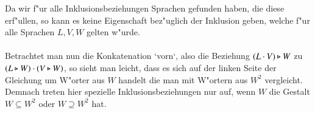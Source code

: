 Da wir f"ur alle Inklusionsbeziehungen Sprachen gefunden haben, die diese erf"ullen, so kann es keine Eigenschaft bez"uglich der Inklusion geben, welche f"ur alle Sprachen $L,V,W$ gelten w"urde.\\\\
Betrachtet man nun die Konkatenation `vorn`, also die Beziehung $(L\cdot V)\triangleright W$ zu  $(L\triangleright W) \cdot (V\triangleright W)$, so sieht man leicht, dass es sich auf 
der linken Seite der Gleichung um W"orter aus $W$ handelt die man mit W"ortern aus $W^2$ vergleicht. \\
Demnach treten hier spezielle Inklusionsbeziehungen nur auf, wenn $W$ die Gestalt $W\subseteq W^2$ oder $W\supseteq W^2$ hat.

